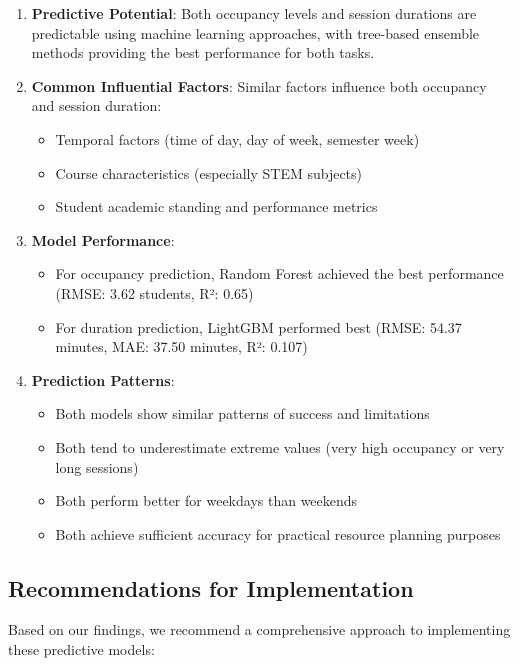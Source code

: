 \documentclass[12pt,letterpaper]{article}
\begin{document}
\begin{enumerate}
    \item \textbf{Predictive Potential}: Both occupancy levels and session durations are predictable using machine learning approaches, with tree-based ensemble methods providing the best performance for both tasks.

    \item \textbf{Common Influential Factors}: Similar factors influence both occupancy and session duration:
    \begin{itemize}
        \item Temporal factors (time of day, day of week, semester week)
        \item Course characteristics (especially STEM subjects)
        \item Student academic standing and performance metrics
    \end{itemize}

    \item \textbf{Model Performance}:
    \begin{itemize}
        \item For occupancy prediction, Random Forest achieved the best performance (RMSE: 3.62 students, R²: 0.65)
        \item For duration prediction, LightGBM performed best (RMSE: 54.37 minutes, MAE: 37.50 minutes, R²: 0.107)
    \end{itemize}

    \item \textbf{Prediction Patterns}:
    \begin{itemize}
        \item Both models show similar patterns of success and limitations
        \item Both tend to underestimate extreme values (very high occupancy or very long sessions)
        \item Both perform better for weekdays than weekends
        \item Both achieve sufficient accuracy for practical resource planning purposes
    \end{itemize}
\end{enumerate}

\subsection{Recommendations for Implementation}

Based on our findings, we recommend a comprehensive approach to implementing these predictive models:
\end{document}
